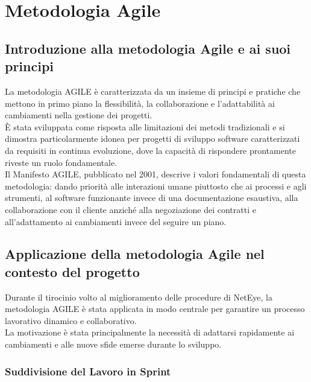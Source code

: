 \chapter{Metodologia Agile}
\label{cha:agile}

\section{Introduzione alla metodologia Agile e ai suoi principi}
\label{sec:introduzione_agile}

La metodologia AGILE è caratterizzata da un insieme di principi e pratiche che mettono
in primo piano la flessibilità, la collaborazione e l'adattabilità ai
cambiamenti nella gestione dei progetti.\\ È stata sviluppata come risposta alle
limitazioni dei metodi tradizionali e si dimostra particolarmente idonea per
progetti di sviluppo software caratterizzati da requisiti in continua evoluzione,
dove la capacità di rispondere prontamente riveste un ruolo fondamentale.\\ Il Manifesto
AGILE, pubblicato nel 2001, descrive i valori fondamentali di questa metodologia:
dando priorità alle interazioni umane piuttosto che ai processi e agli strumenti,
al software funzionante invece di una documentazione esaustiva, alla
collaborazione con il cliente anziché alla negoziazione dei contratti e all'adattamento
ai cambiamenti invece del seguire un piano.

\section{Applicazione della metodologia Agile nel contesto del progetto}
\label{sec:applicazione_agile}

Durante il tirocinio volto al miglioramento delle procedure di NetEye, la
metodologia AGILE è stata applicata in modo centrale per garantire un processo
lavorativo dinamico e collaborativo.\\ La motivazione è stata principalmente la
necessità di adattarsi rapidamente ai cambiamenti e alle nuove sfide emerse
durante lo sviluppo.

\subsection{Suddivisione del Lavoro in Sprint}
\label{sub:sprint}

